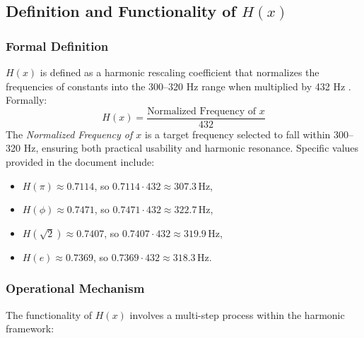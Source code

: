 \subsection{Definition and Functionality of \( H(x) \)}
\label{subsec:h_x_definition_functionality}
\subsubsection{Formal Definition}
\( H(x) \) is defined as a harmonic rescaling coefficient that normalizes the frequencies of constants into the 300--320 Hz range when multiplied by 432 Hz \cite{irrational_constant_solved}. Formally:
\[
H(x) = \frac{\text{Normalized Frequency of } x}{432}
\]
The \textit{Normalized Frequency of \( x \)} is a target frequency selected to fall within 300--320 Hz, ensuring both practical usability and harmonic resonance. Specific values provided in the document include:
\begin{itemize}
    \item \( H(\pi) \approx 0.7114 \), so \( 0.7114 \cdot 432 \approx 307.3 \, \text{Hz} \),
    \item \( H(\phi) \approx 0.7471 \), so \( 0.7471 \cdot 432 \approx 322.7 \, \text{Hz} \),
    \item \( H(\sqrt{2}) \approx 0.7407 \), so \( 0.7407 \cdot 432 \approx 319.9 \, \text{Hz} \),
    \item \( H(e) \approx 0.7369 \), so \( 0.7369 \cdot 432 \approx 318.3 \, \text{Hz} \).
\end{itemize}

\subsubsection{Operational Mechanism}
The functionality of \( H(x) \) involves a multi-step process within the harmonic framework:

